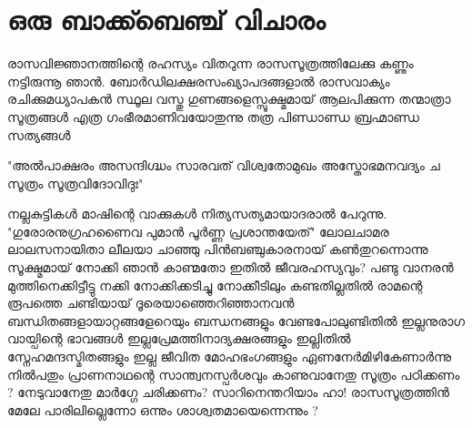 \chapter{ഒരു ബാക്ക്ബെഞ്ച് വിചാരം}
\obeylines
\noindent
രാസവിജ്ഞാനത്തിന്റെ രഹസ്യം വിതറുന്ന
രാസസൂത്രത്തിലേക്കു കണ്ണും നട്ടിരുന്നൂ ഞാൻ.
ബോർഡിലക്ഷരസംഖ്യാപദങ്ങളാൽ
രാസവാക്യം രചിക്കുമധ്യാപകൻ
സ്ഥൂല വസ്തു ഗുണങ്ങളെസ്സൂക്ഷ്മമായ്
ആലപിക്കുന്ന തന്മാത്രാ സൂത്രങ്ങൾ
എത്ര ഗംഭീരമാണിവയോതുന്നു
തത്ര പിണ്ഡാണ്ഡ ബ്രഹ്മാണ്ഡ സത്യങ്ങൾ 
\begin{center}
"അൽപാക്ഷരം അസന്ദിഗ്ദ്ധം 
സാരവത് വിശ്വതോമുഖം 
അസ്തോഭമനവദ്യം ച 
സൂത്രം സൂത്രവിദോവിദുഃ"
\end{center}
\noindent
നല്ലകുട്ടികൾ മാഷിന്റെ വാക്കുകൾ 
നിത്യസത്യമായാദരാൽ പേറുന്നു.
"ഗുരോരനുഗ്രഹണൈവ പുമാൻ പൂർണ്ണ പ്രശാന്തയേത്" 
ലോലചാമര ലാലസനായിതാ 
ലീലയാ ചാഞ്ഞു പിൻബഞ്ചുകാരനായ് 
കൺതുറന്നൊന്നു സൂക്ഷ്മമായ് നോക്കി ഞാൻ 
കാണ്മതോ ഇതിൽ ജീവരഹസ്യവും? 
പണ്ടു വാനരൻ മുത്തിനെക്കിട്ടീട്ടു 
നക്കി നോക്കിക്കടിച്ചു നോക്കീടിലും 
കണ്ടതില്ലതിൽ രാമന്റെ രൂപത്തെ 
ചണ്ടിയായ് ദൂരെയാഞ്ഞെറിഞ്ഞാനവൻ 
ബന്ധിതങ്ങളായാറ്റങ്ങളേറെയും 
ബന്ധനങ്ങളും വേണ്ടപോലുണ്ടിതിൽ 
ഇല്ലനുരാഗ വായ്പിന്റെ ഭാവങ്ങൾ 
ഇല്ലപ്രേമത്തിനാദ്യക്ഷരങ്ങളും 
ഇല്ലിതിൽ സ്നേഹമന്ദസ്മിതങ്ങളും 
ഇല്ല ജീവിത മോഹഭംഗങ്ങളും 
ഏണനേർമിഴികേണാർന്നു നിൽപതും 
പ്രാണനാഥന്റെ സാന്ത്വനസ്പർശവും 
കാണുവാനേതു സൂത്രം പഠിക്കണം ?
നേടുവാനേതു മാർഗ്ഗേ ചരിക്കണം?
സാറിനെന്തറിയാം ഹാ! രാസസൂത്രത്തിൻ മേലേ 
പാരിലില്ലെന്നോ ഒന്നും ശാശ്വതമായെന്നെന്നും ?
